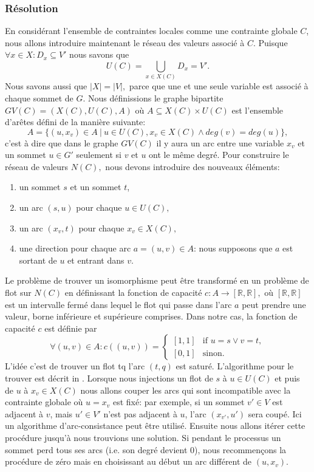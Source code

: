 \documentclass[french]{article}
\theoremstyle{definition}
\theoremstyle{remark}
\begin{document}
\subsubsection{Résolution}
En considérant l'ensemble de contraintes locales comme une contrainte globale $C$, nous allons introduire maintenant le réseau des valeurs \cite{regin} associé à $C$. Puisque $\forall x \in X: D_x \subseteq V'$ nous savons que
$$U(C)=\bigcup_{x \in X(C)} D_x = V'.$$
Nous savons aussi que $|X|=|V|,$ parce que une et une seule variable est associé à chaque sommet de $G$. Nous définissions le graphe bipartite $GV(C)=(X(C), U(C), A)$ où $A \subseteq X(C) \times U(C)$ est l'ensemble d'arêtes défini de la manière suivante:
$$A=\{(u, x_v) \in A\ |\ u \in U(C), x_v \in X(C) \land deg(v)=deg(u) \},$$
c'est à dire que dans le graphe $GV(C)$ il y aura un arc entre une variable $x_v$ et un sommet $u \in G'$ seulement si $v$ et $u$ ont le même degré. 
Pour construire le réseau de valeurs $N(C),$ nous devons introduire des nouveaux éléments:
\begin{enumerate}
	\item un sommet $s$ et un sommet $t$,
	\item un arc $(s, u)$ pour chaque $u \in U(C),$
	\item un arc $(x_v, t)$ pour chaque $x_v \in X(C),$
	\item une direction pour chaque arc $a=(u,v) \in A$: nous supposons que $a$ est sortant de $u$ et entrant dans $v$.
\end{enumerate}
 Le problème de trouver un isomorphisme peut être transformé en un problème de flot sur $N(C)$ en définissant la fonction de capacité $c: A \rightarrow [\mathbb{R}, \mathbb{R}],$ où  $[\mathbb{R}, \mathbb{R}]$ est un intervalle fermé dans lequel le flot qui passe dans l'arc $a$ peut prendre une valeur, borne inférieure et supérieure comprises. Dans notre cas, la fonction de capacité $c$ est définie par
\[  \forall (u,v) \in A:
c((u,v))= 
\begin{cases}
[1,1]& \text{if } u=s \lor v=t,\\
[0,1]              & \text{sinon}.
\end{cases}
\]
L'idée c'est de trouver un flot tq l'arc $(t,q)$ est saturé. L'algorithme pour le trouver est décrit in \cite{regin}.
Lorsque nous injections un flot de $s$ à $u \in U(C)$ et puis de $u$ à $x_v \in X(C)$ nous allons couper les arcs qui sont incompatible avec la contrainte globale où $u=x_v$ est fixé: par exemple, si un sommet $v' \in V$ est adjacent à $v$, mais $u' \in V'$ n'est pas adjacent à $u$, l'arc $(x_{v'},u')$ sera coupé. Ici un algorithme d'arc-consistance peut être utilisé. Ensuite nous allons itérer cette procédure jusqu'à nous trouvions une solution. Si pendant le processus un sommet perd tous ses arcs (i.e. son degré devient $0$), nous recommençons la procédure de zéro mais en choisissant au début un arc différent de $(u, x_v).$
\end{document}
